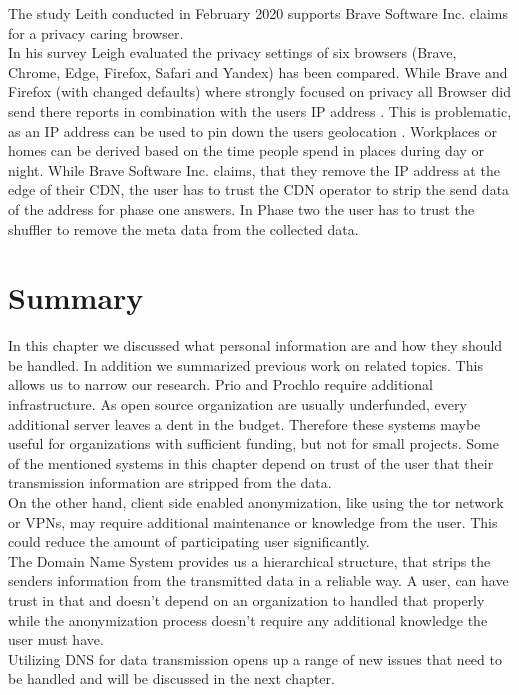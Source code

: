         The study Leith conducted in February 2020  \cite{leith_web_2020} supports Brave Software Inc. claims
        for a privacy caring browser.\\
        In his survey Leigh evaluated the privacy settings of six browsers (Brave, Chrome, Edge, Firefox, Safari and Yandex) has been compared. While Brave and Firefox (with changed defaults) where strongly focused on privacy all Browser did send there reports in combination with the users IP address \cite{leith_web_2020}.
        This is problematic, as an IP address can be used to pin down the users geolocation \cite{koch_geolocation_2013}. Workplaces or homes can be derived based on the time people spend in places during day or night. 
        While Brave Software Inc. claims, that they remove the IP address at the edge of their CDN, the user has to trust the CDN operator to strip the send data of the address for phase one answers. In Phase two the user has to trust the shuffler to remove the meta data from the collected data. 
\newpage
\section{Summary}
    In this chapter we discussed what personal information are and how they should be handled.
    In addition we summarized previous work on related topics. This allows us to narrow our research.
    Prio and Prochlo require additional infrastructure. As open source organization are usually underfunded, every additional server leaves a dent in the budget. Therefore these systems maybe
    useful for organizations with sufficient funding, but not for small projects. Some of the mentioned systems in this chapter depend on trust of the user that their transmission information are stripped from the data.\\
    
    On the other hand, client side enabled anonymization, like using the tor network or VPNs, may require additional maintenance or knowledge from the user. This could reduce the amount of participating user significantly.\\
    
    The Domain Name System provides us a hierarchical structure, that strips the senders information from the transmitted data in a reliable way. A user, can have trust in that and doesn't depend on an organization to handled that properly while the anonymization process doesn't require any additional knowledge the user must have.\\
    Utilizing DNS for data transmission opens up a range of new issues that need to be handled and will be discussed in the next chapter.\\ 
    
    
%


  